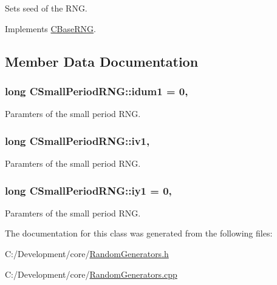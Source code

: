 Sets seed of the R\-N\-G. 



Implements \hyperlink{class_c_base_r_n_g_a56fbf75ca07b73954596ee04820e0b07}{C\-Base\-R\-N\-G}.



\subsection{Member Data Documentation}
\hypertarget{class_c_small_period_r_n_g_a71f1b2a5e8fb9ea6b7dca1086b2ee407}{
\subsubsection[{idum1}]{\setlength{\rightskip}{0pt plus 5cm}long C\-Small\-Period\-R\-N\-G\-::idum1 = 0\hspace{0.3cm}{\ttfamily [static]}, {\ttfamily [private]}}}\label{class_c_small_period_r_n_g_a71f1b2a5e8fb9ea6b7dca1086b2ee407}


Paramters of the small period R\-N\-G. 

\hypertarget{class_c_small_period_r_n_g_adbc06e71f816140c47a14050087c0d35}{
\subsubsection[{iv1}]{\setlength{\rightskip}{0pt plus 5cm}long C\-Small\-Period\-R\-N\-G\-::iv1\hspace{0.3cm}{\ttfamily [static]}, {\ttfamily [private]}}}\label{class_c_small_period_r_n_g_adbc06e71f816140c47a14050087c0d35}


Paramters of the small period R\-N\-G. 

\hypertarget{class_c_small_period_r_n_g_aa06811ff44a472047f67cc157fec2add}{
\subsubsection[{iy1}]{\setlength{\rightskip}{0pt plus 5cm}long C\-Small\-Period\-R\-N\-G\-::iy1 = 0\hspace{0.3cm}{\ttfamily [static]}, {\ttfamily [private]}}}\label{class_c_small_period_r_n_g_aa06811ff44a472047f67cc157fec2add}


Paramters of the small period R\-N\-G. 



The documentation for this class was generated from the following files\-:\begin{DoxyCompactItemize}
\item 
C\-:/\-Development/core/\hyperlink{_random_generators_8h}{Random\-Generators.\-h}\item 
C\-:/\-Development/core/\hyperlink{_random_generators_8cpp}{Random\-Generators.\-cpp}\end{DoxyCompactItemize}
